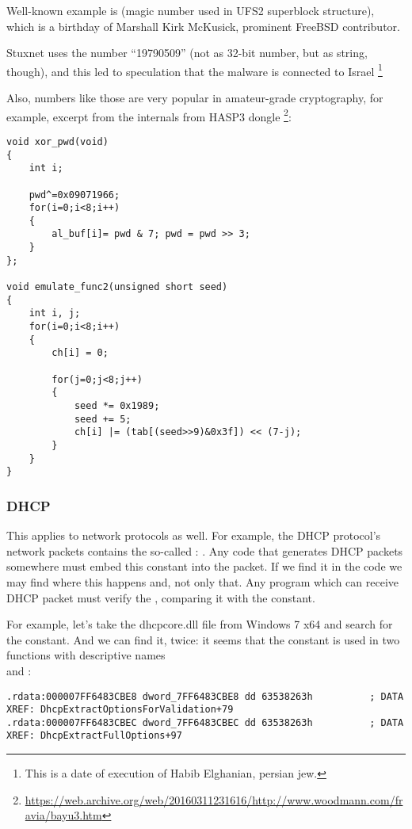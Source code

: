 Well-known example is  (magic number used in UFS2 superblock structure), which is a birthday of Marshall Kirk McKusick, prominent FreeBSD contributor.

Stuxnet uses the number ``19790509'' (not as 32-bit number, but as string, though), and this led to speculation
that the malware is connected to Israel
\footnote{This is a date of execution of Habib Elghanian, persian jew.}

Also, numbers like those are very popular in amateur-grade cryptography, for example, excerpt from the  internals from HASP3 dongle
\footnote{\url{https://web.archive.org/web/20160311231616/http://www.woodmann.com/fravia/bayu3.htm}}:

\begin{lstlisting}
void xor_pwd(void) 
{ 
	int i; 
	
	pwd^=0x09071966;
	for(i=0;i<8;i++) 
	{ 
		al_buf[i]= pwd & 7; pwd = pwd >> 3; 
	} 
};

void emulate_func2(unsigned short seed)
{ 
	int i, j; 
	for(i=0;i<8;i++) 
	{ 
		ch[i] = 0; 
		
		for(j=0;j<8;j++)
		{ 
			seed *= 0x1989; 
			seed += 5; 
			ch[i] |= (tab[(seed>>9)&0x3f]) << (7-j); 
		}
	} 
}
\end{lstlisting}

\subsubsection{DHCP}

This applies to network protocols as well.
For example, the DHCP protocol's network packets contains the so-called : .
Any code that generates DHCP packets somewhere must embed this constant into the packet.
If we find it in the code we may find where this happens and, not only that.
Any program which can receive DHCP packet must verify the , comparing it with the constant.

For example, let's take the dhcpcore.dll file from Windows 7 x64 and search for the constant.
And we can find it, twice:
it seems that the constant is used in two functions with descriptive names\\
 and :

\begin{lstlisting}[caption=dhcpcore.dll (Windows 7 x64)]
.rdata:000007FF6483CBE8 dword_7FF6483CBE8 dd 63538263h          ; DATA XREF: DhcpExtractOptionsForValidation+79
.rdata:000007FF6483CBEC dword_7FF6483CBEC dd 63538263h          ; DATA XREF: DhcpExtractFullOptions+97
\end{lstlisting}


